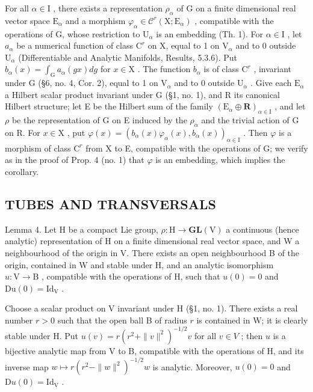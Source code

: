 For all \(\alpha \in \mathrm{I}\) , there exists a representation \(\rho_{\alpha}\) of G on a finite dimensional real vector space \(\mathrm{E}_{\alpha}\) and a morphism \(\varphi_{\alpha} \in \mathcal{C}^r (\mathrm{X};\mathrm{E}_{\alpha})\) , compatible with the operations of G, whose restriction to \(\mathrm{U}_{\alpha}\) is an embedding (Th. 1). For \(\alpha \in \mathrm{I}\) , let \(a_{\alpha}\) be a numerical function of class \(\mathrm{C}^r\) on X, equal to 1 on \(\mathrm{V}_{\alpha}\) and to 0 outside \(\mathrm{U}_{\alpha}\) (Differentiable and Analytic Manifolds, Results, 5.3.6). Put \(b_{\alpha}(x) = \int_{\mathrm{G}} a_{\alpha}(gx) dg\) for \(x \in \mathrm{X}\) . The function \(b_{\alpha}\) is of class \(\mathrm{C}^r\) , invariant under G (§6, no. 4, Cor. 2), equal to 1 on \(\mathrm{V}_{\alpha}\) and to 0 outside \(\mathrm{U}_{\alpha}\) . Give each \(\mathrm{E}_{\alpha}\) a Hilbert scalar product invariant under G (§1, no. 1), and R its canonical Hilbert structure; let E be the Hilbert sum of the family \((\mathrm{E}_{\alpha} \oplus \mathbf{R})_{\alpha \in \mathrm{I}}\) , and let \(\rho\) be the representation of G on E induced by the \(\rho_{\alpha}\) and the trivial action of G on R. For \(x \in \mathrm{X}\) , put \(\varphi(x) = (b_{\alpha}(x)\varphi_{\alpha}(x), b_{\alpha}(x))_{\alpha \in \mathrm{I}}\) . Then \(\varphi\) is a morphism of class \(\mathrm{C}^r\) from X to E, compatible with the operations of G; we verify as in the proof of Prop. 4 (no. 1) that \(\varphi\) is an embedding, which implies the corollary.

\subsection{TUBES AND TRANSVERSALS}

Lemma 4. Let H be a compact Lie group, \(\rho : \mathrm{H} \to \mathbf{GL}(\mathrm{V})\) a continuous (hence analytic) representation of H on a finite dimensional real vector space, and W a neighbourhood of the origin in V. There exists an open neighbourhood B of the origin, contained in W and stable under H, and an analytic isomorphism \(u: \mathrm{V} \to \mathrm{B}\) , compatible with the operations of H, such that \(u(0) = 0\) and \(\mathrm{Du}(0) = \mathrm{Id}_{\mathrm{V}}\) .

Choose a scalar product on V invariant under H (§1, no. 1). There exists a real number \(r > 0\) such that the open ball B of radius \(r\) is contained in W; it is clearly stable under H. Put \(u(v) = r(r^2 + \|v\|^2)^{-1/2} v\) for all \(v \in V\) ; then \(u\) is a bijective analytic map from V to B, compatible with the operations of H, and its inverse map \(w \mapsto r(r^2 - \|w\|^2)^{-1/2} w\) is analytic. Moreover, \(u(0) = 0\) and \(\mathrm{D}u(0) = \mathrm{Id}_{\mathrm{V}}\) .

